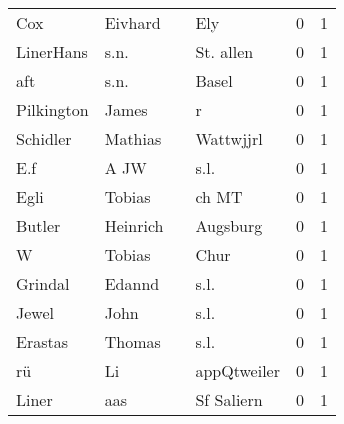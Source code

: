 \begin{tabular}{llllrr}
                      Cox &                            Eivhard &             &                                         Ely &          0 &         1 \\
                LinerHans &                               s.n. &             &                                   St. allen &          0 &         1 \\
                      aft &                               s.n. &             &                                       Basel &          0 &         1 \\
               Pilkington &                              James &             &                                           r &          0 &         1 \\
                 Schidler &                            Mathias &             &                                   Wattwjjrl &          0 &         1 \\
                      E.f &                               A JW &             &                                        s.l. &          0 &         1 \\
                     Egli &                             Tobias &             &                                       ch MT &          0 &         1 \\
                   Butler &                           Heinrich &             &                                    Augsburg &          0 &         1 \\
                        W &                             Tobias &             &                                        Chur &          0 &         1 \\
                  Grindal &                             Edannd &             &                                        s.l. &          0 &         1 \\
                    Jewel &                               John &             &                                        s.l. &          0 &         1 \\
                  Erastas &                             Thomas &             &                                        s.l. &          0 &         1 \\
                       rü &                                 Li &             &                                 appQtweiler &          0 &         1 \\
                    Liner &                                aas &             &                                  Sf Saliern &          0 &         1 \\

\end{tabular}
